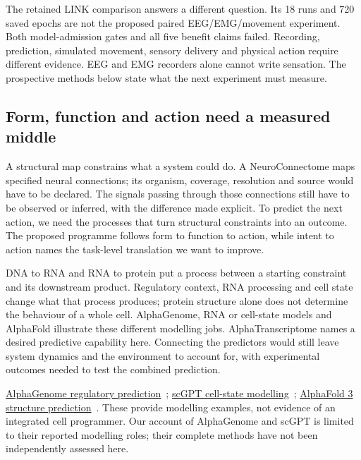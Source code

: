 The retained LINK comparison answers a different question. Its 18 runs and
720 saved epochs are not the proposed paired EEG/EMG/movement experiment.
Both model-admission gates and all five benefit claims failed. Recording,
prediction, simulated movement, sensory delivery and physical action require
different evidence. EEG and EMG recorders alone cannot write sensation.
The prospective methods below state what the next experiment must measure.

\subsection{Form, function and action need a measured middle}
A structural map constrains what a system could do. A NeuroConnectome maps
specified neural connections; its organism, coverage, resolution and source
would have to be declared. The signals passing through those connections
still have to be observed or inferred, with the difference made explicit.
To predict the next action, we need the processes that turn structural
constraints into an outcome. The proposed programme follows form to function
to action, while intent to action names the task-level translation we want
to improve.

DNA to RNA and RNA to protein put a process between a starting constraint and
its downstream product. Regulatory context, RNA processing and cell state
change what that process produces; protein structure alone does not determine
the behaviour of a whole cell. AlphaGenome, RNA or cell-state models and
AlphaFold illustrate these different modelling jobs. AlphaTranscriptome names
a desired predictive capability here. Connecting the predictors would still
leave system dynamics and the environment to account for, with experimental
outcomes needed to test the combined prediction.
\par\noindent \href{https://www.nature.com/articles/s41586-025-10014-0}{AlphaGenome regulatory prediction}~\cite{alphagenomeRetained};
\href{https://www.nature.com/articles/s41592-024-02201-0}{scGPT cell-state modelling}~\cite{scgptRetained};
\href{https://www.nature.com/articles/s41586-024-07487-w}{AlphaFold 3 structure prediction}~\cite{alphafold32024}.
These provide modelling examples, not evidence of an integrated cell programmer.
Our account of AlphaGenome and scGPT is limited to their reported modelling roles;
their complete methods have not been independently assessed here.

